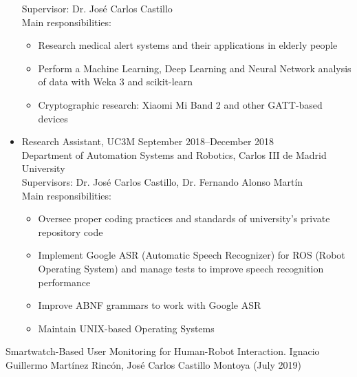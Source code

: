 \documentclass[11pt]{article}
\let\oldbibentry\bibentry
\renewcommand{\bibentry}[1]{\oldbibentry{#1}.}
\renewcommand{\section}[1]
{\vspace{1.0\baselineskip}{\Large\textbf{#1}}}
\begin{document}
\begin{itemize}[leftmargin=12pt]
    Supervisor: Dr. José Carlos Castillo \\
    Main responsibilities:
    \begin{itemize}
        \item Research medical alert systems and their applications in elderly people
        \item Perform a Machine Learning, Deep Learning and Neural Network analysis of data with Weka 3 and scikit-learn
        \item Cryptographic research: Xiaomi Mi Band 2 and other GATT-based devices
    \end{itemize}
  \item[] Research Assistant, UC3M \hfill September 2018--December 2018 \\
    Department of Automation Systems and Robotics, Carlos III de Madrid University \\
    Supervisors: Dr. José Carlos Castillo, Dr. Fernando Alonso Martín \\
    Main responsibilities:
    \begin{itemize}
        \item Oversee proper coding practices and standards of university's private repository code
        \item Implement Google ASR (Automatic Speech Recognizer) for ROS (Robot Operating System) and manage tests to improve speech recognition performance
        \item Improve ABNF grammars to work with Google ASR
        \item Maintain UNIX-based Operating Systems
    \end{itemize}
\end{itemize}

\section{Publications}

Smartwatch-Based User Monitoring for Human-Robot Interaction. Ignacio Guillermo Martínez Rincón, José Carlos Castillo Montoya (July 2019)

\newpage


\end{document}
